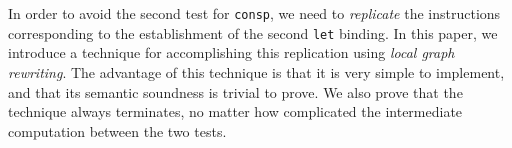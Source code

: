In order to avoid the second test for \texttt{consp}, we need to
\emph{replicate} the instructions corresponding to the establishment
of the second \texttt{let} binding.  In this paper, we introduce a
technique for accomplishing this replication using \emph{local graph
  rewriting}.  The advantage of this technique is that it is very
simple to implement, and that its semantic soundness is trivial to
prove.  We also prove that the technique always terminates, no matter
how complicated the intermediate computation between the two tests.
